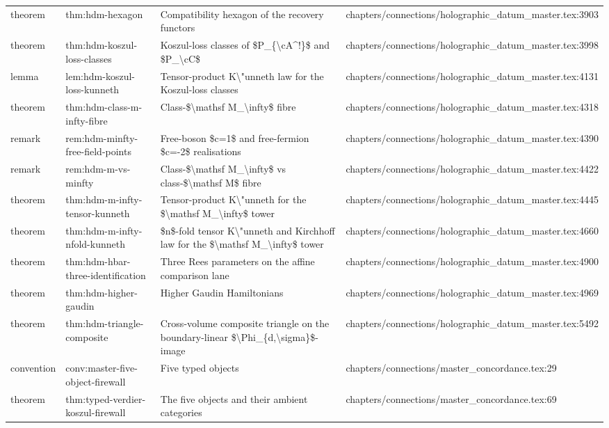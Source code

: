 \documentclass[11pt]{article}
\begin{document}
\begin{longtable}{L{0.10\textwidth}L{0.26\textwidth}L{0.42\textwidth}L{0.22\textwidth}}
theorem & thm:hdm-hexagon & Compatibility hexagon of the recovery functors & chapters/connections/holographic\_datum\_master.tex:3903\\
theorem & thm:hdm-koszul-loss-classes & Koszul-loss classes of \$P\_\{\textbackslash{}cA\textasciicircum{}!\}\$ and \$P\_\textbackslash{}cC\$ & chapters/connections/holographic\_datum\_master.tex:3998\\
lemma & lem:hdm-koszul-loss-kunneth & Tensor-product K\textbackslash{}"unneth law for the Koszul-loss classes & chapters/connections/holographic\_datum\_master.tex:4131\\
theorem & thm:hdm-class-m-infty-fibre & Class-\$\textbackslash{}mathsf M\_\textbackslash{}infty\$ fibre & chapters/connections/holographic\_datum\_master.tex:4318\\
remark & rem:hdm-minfty-free-field-points & Free-boson \$c=1\$ and free-fermion \$c=-2\$ realisations & chapters/connections/holographic\_datum\_master.tex:4390\\
remark & rem:hdm-m-vs-minfty & Class-\$\textbackslash{}mathsf M\_\textbackslash{}infty\$ vs class-\$\textbackslash{}mathsf M\$ fibre & chapters/connections/holographic\_datum\_master.tex:4422\\
theorem & thm:hdm-m-infty-tensor-kunneth & Tensor-product K\textbackslash{}"unneth for the \$\textbackslash{}mathsf M\_\textbackslash{}infty\$ tower & chapters/connections/holographic\_datum\_master.tex:4445\\
theorem & thm:hdm-m-infty-nfold-kunneth & \$n\$-fold tensor K\textbackslash{}"unneth and Kirchhoff law for the \$\textbackslash{}mathsf M\_\textbackslash{}infty\$ tower & chapters/connections/holographic\_datum\_master.tex:4660\\
theorem & thm:hdm-hbar-three-identification & Three Rees parameters on the affine comparison lane & chapters/connections/holographic\_datum\_master.tex:4900\\
theorem & thm:hdm-higher-gaudin & Higher Gaudin Hamiltonians & chapters/connections/holographic\_datum\_master.tex:4969\\
theorem & thm:hdm-triangle-composite & Cross-volume composite triangle on the boundary-linear \$\textbackslash{}Phi\_\{d,\textbackslash{}sigma\}\$-image & chapters/connections/holographic\_datum\_master.tex:5492\\
convention & conv:master-five-object-firewall & Five typed objects & chapters/connections/master\_concordance.tex:29\\
theorem & thm:typed-verdier-koszul-firewall & The five objects and their ambient categories & chapters/connections/master\_concordance.tex:69\\

\end{longtable}
\end{document}
